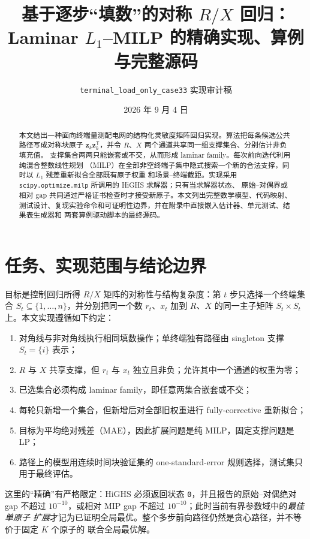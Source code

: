 \documentclass[UTF8,11pt]{ctexart}
\title{基于逐步“填数”的对称 $R/X$ 回归：\\
Laminar $L_1$--MILP 的精确实现、算例与完整源码}
\author{\texttt{terminal\_load\_only\_case33} 实现审计稿}
\date{2026 年 9 月 4 日}
\newcommand{\zv}{\bm z}
\begin{document}
\maketitle

\begin{abstract}
本文给出一种面向终端量测配电网的结构化灵敏度矩阵回归实现。算法把每条候选公共路径写成对称块原子
$\zv_k\zv_k^{\mathsf T}$，并令 $R$、$X$ 两个通道共享同一组支撑集合、分别估计非负填充值。
支撑集合两两只能嵌套或不交，从而形成 laminar family。每次前向迭代利用纯混合整数线性规划
（MILP）在全部非空终端子集中隐式搜索一个新的合法支撑，同时以 $L_1$ 残差重新拟合全部既有原子权重
和场景--终端截距。实现采用 \texttt{scipy.optimize.milp} 所调用的 HiGHS 求解器；只有当求解器状态、
原始--对偶界或相对 gap 共同通过严格证书检查时才接受新原子。本文列出完整数学模型、代码映射、
测试设计、复现实验命令和可证明性边界，并在附录中直接嵌入估计器、单元测试、结果表生成器和
两套算例驱动脚本的最终源码。
\end{abstract}

\tableofcontents
\clearpage

\section{任务、实现范围与结论边界}

目标是控制回归所得 $R/X$ 矩阵的对称性与结构复杂度：第 $t$ 步只选择一个终端集合
$S_t\subseteq\{1,\ldots,n\}$，并分别把同一个数 $r_t$、$x_t$ 加到 $R$、$X$ 的同一主子矩阵
$S_t\times S_t$ 上。本文实现遵循如下约定：
\begin{enumerate}
  \item 对角线与非对角线执行相同填数操作；单终端独有路径由 singleton 支撑 $S_t=\{i\}$ 表示；
  \item $R$ 与 $X$ 共享支撑，但 $r_t$ 与 $x_t$ 独立且非负；允许其中一个通道的权重为零；
  \item 已选集合必须构成 laminar family，即任意两集合嵌套或不交；
  \item 每轮只新增一个集合，但新增后对全部旧权重进行 fully-corrective 重新拟合；
  \item 目标为平均绝对残差（MAE），因此扩展问题是纯 MILP，固定支撑问题是 LP；
  \item 路径上的模型用连续时间块验证集的 one-standard-error 规则选择，测试集只用于最终评估。
\end{enumerate}

这里的“精确”有严格限定：HiGHS 必须返回状态 \texttt{0}，并且报告的原始--对偶绝对 gap
不超过 $10^{-10}$，或相对 MIP gap 不超过 $10^{-10}$；此时当前有界参数域中的\emph{最佳单原子
扩展}才记为已证明全局最优。整个多步前向路径仍然是贪心路径，并不等价于固定 $K$ 个原子的
联合全局最优解。
\end{document}
